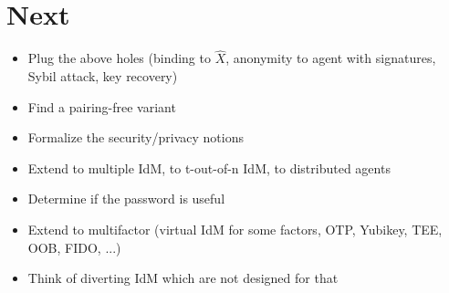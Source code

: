 \section{Next}

\begin{itemize}
	\item Plug the above holes (binding to $\hat{X}$, anonymity to agent with signatures, Sybil attack, key recovery)
	\item Find a pairing-free variant
	\item Formalize the security/privacy notions
	\item Extend to multiple IdM, to t-out-of-n IdM, to distributed agents
	\item Determine if the password is useful
	\item Extend to multifactor (virtual IdM for some factors, OTP, Yubikey, TEE, OOB, FIDO, ...)
	\item Think of diverting IdM which are not designed for that
\end{itemize}